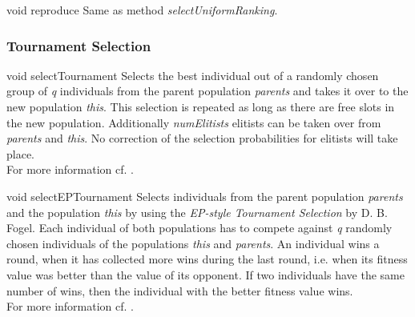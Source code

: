 \vspace*{4ex}

\setNormalInstance
\setCorrectWidthThree{8pt}
\printMethodWithParamsSaved
{void}
{}
{reproduce}
{Same as method {\em selectUniformRanking}.}
{}
\setCorrectWidthThree{4pt}

\clearpage

\subsubsection{Tournament Selection}

\setNormalInstance
\setCorrectWidthThree{8pt}
\printMethodWithParamsSaved
{void}
{}
{selectTournament}
{Selects the best individual out of a randomly chosen group of {\em q}
 individuals from the parent population {\em parents} and takes it over
 to the new population {\em this}. This selection is repeated as long as
 there are free slots in the new population. Additionally
 {\em numElitists} elitists can be taken over from {\em parents} and
 {\em this}. No correction of the selection probabilities for elitists
 will take place.\\
 For more information cf. \cite{Goldberg}.}
{}
\setCorrectWidthThree{4pt}

\vspace*{4ex}

\setNormalInstance
\setCorrectWidthThree{8pt}
\printMethodWithParamsSaved
{void}
{}
{selectEPTournament}
{Selects individuals from the parent population {\em parents} and
 the population {\em this} by using the {\em EP-style Tournament Selection}
 by D. B. Fogel. Each individual of both populations has
 to compete against {\em q} randomly chosen individuals of the
 populations {\em this} and {\em parents}. An individual wins a round,
when it has collected more wins during the last round, i.e.
when its fitness value was better than the value of its opponent. If
two individuals have the same number of wins, then the individual with
the better fitness value wins.\\
For more information cf. \cite{Fogel}.}
{}
\setCorrectWidthThree{4pt}


